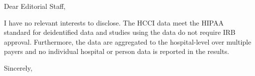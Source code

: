 \documentclass[12pt]{letter} %
\begin{document}

\begin{letter}{} %


\opening{Dear Editorial Staff,}

I have no relevant interests to disclose.  The HCCI data meet the HIPAA standard for deidentified data and studies using the data do not require IRB approval. Furthermore, the data are aggregated to the hospital-level over multiple payers and no individual hospital or person data is reported in the results.


\vspace{2\parskip} %
\closing{Sincerely,}

\end{letter}
\end{document}
